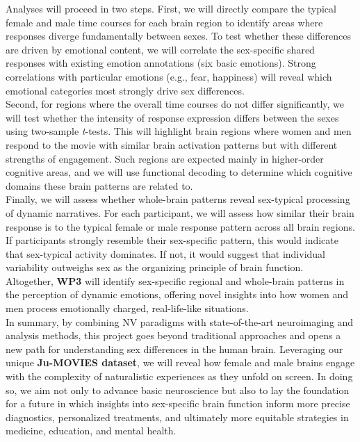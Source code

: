\documentclass[11pt,a4paper]{article}
\begin{document}
Analyses will proceed in two steps. First, we will directly compare the typical female and male time courses
for each brain region to identify areas where responses diverge fundamentally between sexes. To test whether these 
differences are driven by emotional content, we will correlate the sex-specific shared responses with existing emotion annotations 
(six basic emotions). Strong correlations with particular emotions (e.g., fear, happiness) will reveal which emotional 
categories most strongly drive sex differences.\\
Second, for regions where the overall time courses do not differ significantly, we will test whether the intensity 
of response expression differs between the sexes using two-sample \textit{t}-tests. This will highlight brain regions where women and men 
respond to the movie with similar brain activation patterns but with different strengths of engagement. 
Such regions are expected mainly in higher-order cognitive areas, and we will use functional 
decoding \parencite{foxMetaanalysisHumanNeuroimaging2014a} to determine which cognitive domains these brain patterns are
related to.\\  
Finally, we will assess whether whole-brain patterns reveal sex-typical processing of dynamic narratives. 
For each participant, we will assess how similar their brain response is to the typical female or male response pattern 
across all brain regions. If participants strongly resemble their sex-specific pattern, this would indicate that 
sex-typical activity dominates. If not, it would suggest that individual variability outweighs sex as the organizing 
principle of brain function.\\
Altogether, \textbf{WP3} will identify sex-specific regional and whole-brain patterns in the perception of dynamic emotions, 
offering novel insights into how women and men process emotionally charged, real-life-like situations.\\  
[6pt]
In summary, by combining NV paradigms with state-of-the-art neuroimaging and analysis methods, this project goes beyond 
traditional approaches and opens a new path for understanding sex differences in the human brain. Leveraging our unique 
\textbf{Ju-MOVIES dataset}, we will reveal how female and male brains engage with the complexity of naturalistic 
experiences as they unfold on screen. In doing so, we aim not only to advance basic neuroscience but also to lay the 
foundation for a future in which insights into sex-specific brain function inform more precise diagnostics,
personalized treatments, and ultimately more equitable strategies in medicine, education, and mental health.
\end{document}
